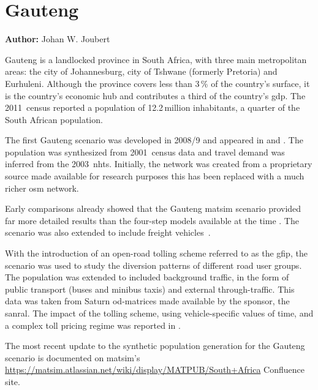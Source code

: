 \chapter{Gauteng}
\label{ch:gauteng}
\hfill \textbf{Author:} Johan W. Joubert


Gauteng is a landlocked province in South Africa, with  three main metropolitan areas: the city of Johannesburg, city of Tshwane (formerly Pretoria) and Eurhuleni. Although the province covers less than 3\,\% of the country's surface, it is the country's economic hub and contributes a third of the country's \gls{gdp}. The 2011~census reported a population of 12.2\,million inhabitants, a quarter of the South African population. 

The first Gauteng scenario was developed in 2008/9 and appeared in \citet[][]{Fourie2009MastersThesis} and \citet[][]{FourieJoubert_SATC_2009}. The population was synthesized from 2001~census data and travel demand was inferred from the 2003~\gls{nhts}. Initially, the network was created from a proprietary source made available for research purposes this has been replaced with a much richer \gls{osm} network.

Early comparisons already showed that the Gauteng \gls{matsim} scenario provided far more detailed results than the four-step models available at the time \citep[][]{Fourie_SATC_2010}. The scenario was also extended to include freight vehicles~\citep[][]{JoubertJEtAl_TRR_2010}.

With the introduction of an open-road tolling scheme referred to as the \gls{gfip}, the scenario was used to study the diversion patterns of different road user groups. The population was extended to included background traffic, in the form of public transport (buses and minibus taxis) and external through-traffic. This data was taken from Saturn \gls{od}-matrices made available by the sponsor, the \gls{sanral}. The impact of the tolling scheme, using vehicle-specific values of time, and a complex toll pricing regime was reported in \citet[][]{NagelKickhoeferJoubert2014HeterogeneousVoTsPROCEDIA}.

The most recent update to the synthetic population generation for the Gauteng scenario is documented on \gls{matsim}'s \url{https://matsim.atlassian.net/wiki/display/MATPUB/South+Africa} Confluence site.

